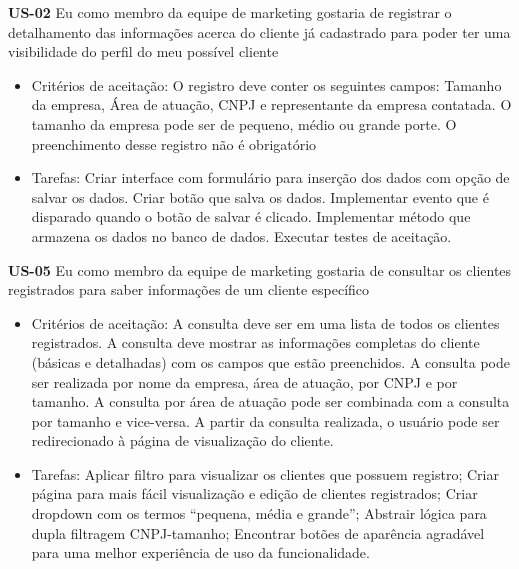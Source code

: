 \textbf{US-02} Eu como membro da equipe de marketing gostaria de registrar o detalhamento das informações acerca do cliente já cadastrado para poder ter uma visibilidade do perfil do meu possível cliente

\begin{itemize}
 \item Critérios de aceitação:
\subitem O registro deve conter os seguintes campos: Tamanho da empresa, Área de atuação, CNPJ e representante da empresa contatada.
\subitem O tamanho da empresa pode ser de pequeno, médio ou grande porte.
\subitem O preenchimento desse registro não é obrigatório

\item Tarefas:
\subitem Criar interface com formulário para inserção dos dados com opção de salvar os dados.
\subitem Criar botão que salva os dados.
\subitem Implementar evento que é disparado quando o botão de salvar é clicado.
\subitem Implementar método que armazena os dados no banco de dados.
\subitem Executar testes de aceitação.

\end{itemize}

\textbf{US-05} Eu como membro da equipe de marketing gostaria de consultar os clientes registrados para saber informações de um cliente específico

\begin{itemize} 
\item Critérios de aceitação:
\subitem A consulta deve ser em uma lista de todos os clientes registrados.
\subitem A consulta deve mostrar as informações completas do cliente (básicas e detalhadas) com os campos que estão preenchidos.
\subitem A consulta pode ser realizada por nome da empresa, área de atuação, por CNPJ e por tamanho.
\subitem A consulta por área de atuação pode ser combinada com a consulta por tamanho e vice-versa.
\subitem A partir da consulta realizada, o usuário pode ser redirecionado à página de visualização do cliente.

\item Tarefas:
\subitem Aplicar filtro para visualizar os clientes que possuem registro;
\subitem Criar página para mais fácil visualização e edição de clientes registrados;
\subitem Criar dropdown com os termos “pequena, média e grande”;
\subitem Abstrair lógica para dupla filtragem CNPJ-tamanho;
\subitem Encontrar botões de aparência agradável para uma melhor experiência de uso da funcionalidade.
\end{itemize}


